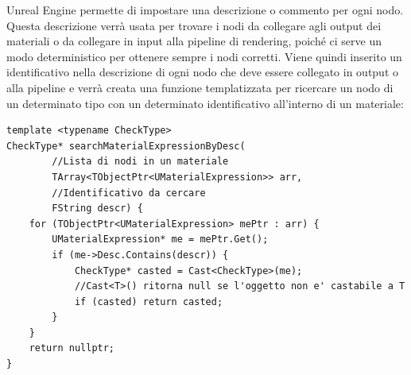 \documentclass[main.tex]{subfiles}
\begin{document}
Unreal Engine permette di impostare una descrizione o commento per ogni nodo. Questa descrizione verrà usata per trovare i nodi da collegare agli output dei materiali o da collegare in input alla pipeline di rendering, poiché ci serve un modo deterministico per ottenere sempre i nodi corretti. Viene quindi inserito un identificativo nella descrizione di ogni nodo che deve essere collegato in output o alla pipeline e verrà creata una funzione templatizzata per ricercare un nodo di un determinato tipo con un determinato identificativo all'interno di un materiale:
\begin{lstlisting}
template <typename CheckType>
CheckType* searchMaterialExpressionByDesc(
        //Lista di nodi in un materiale
        TArray<TObjectPtr<UMaterialExpression>> arr,
        //Identificativo da cercare
        FString descr) {
    for (TObjectPtr<UMaterialExpression> mePtr : arr) {
        UMaterialExpression* me = mePtr.Get();
        if (me->Desc.Contains(descr)) {
            CheckType* casted = Cast<CheckType>(me);
            //Cast<T>() ritorna null se l'oggetto non e' castabile a T
            if (casted) return casted;
        }
    }
    return nullptr;
}
\end{lstlisting}
\end{document}
